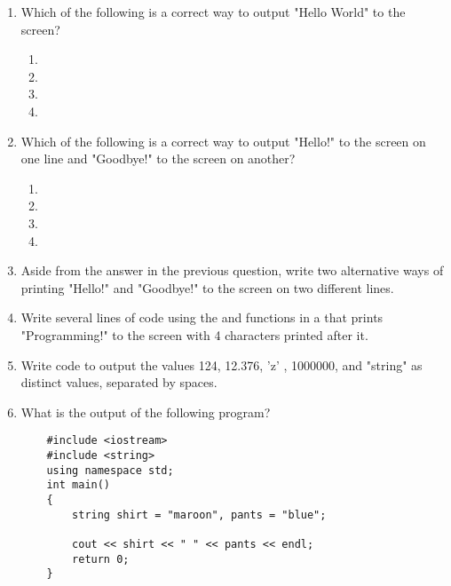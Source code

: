\begin{enumerate}
	\item Which of the following is a correct way to output "Hello World" to the screen?
	  \begin{enumerate}
	  \item {}
	  \item {}
	  \item {}
	  \item {}
	  \end{enumerate}
  \item Which of the following is a correct way to output "Hello!" to the screen on one line and "Goodbye!" to the screen on another?
		\begin{enumerate}
		\item {}
		\item {}
		\item {}
		\item {}
		\end{enumerate}
  \item Aside from the answer in the previous question, write two alternative ways of printing "Hello!" and "Goodbye!" to the screen on two different lines.
	\item Write several lines of code using the  and  functions in a  that prints "Programming!" to the screen with 4  characters printed after it.
	\item Write code to output the values 124, 12.376, 'z' , 1000000, and "string" as distinct values, separated by spaces.
	\item What is the output of the following program?
	\begin{lstlisting}
	#include <iostream>
	#include <string>
	using namespace std;
	int main()
	{
		string shirt = "maroon", pants = "blue";
	 
		cout << shirt << " " << pants << endl;
		return 0;
	}
	\end{lstlisting}

\end{enumerate}



